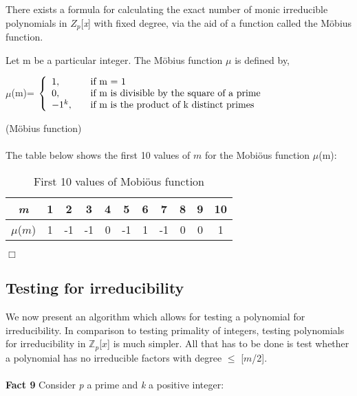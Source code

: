 \documentclass[iwp,first]{luthesis}
\begin{document}
There exists a formula for calculating the exact number of monic irreducible polynomials in $\textit{Z}_p$[\textit{x}] with fixed degree, via the aid of a function called the M\"obius function.

\begin{mydef}
Let m be a particular integer. The M\"obius function $\mu$ is defined by, 

\begin{center}
$\mu$(m)= $\left\{
\begin{array}{l l l}
	1, & \quad \textrm{if m = 1}\\
	0, & \quad \textrm{if m is divisible by the square of a prime}\\
	-1^{k}, & \quad \textrm{if m is the product of k distinct primes}\\
\end{array} \right.$
\end{center}

\end{mydef}

\begin{example} (M\"obius function)
\\
\\
The table below shows the first 10 values of $m$ for the Mobi\"ous function $\mu$(m): 

\begin{table}[ht]
\caption{First 10 values of Mobi\"ous function}
\centering
\begin{tabular}{|c||c|c|c|c|c|c|c|c|c|c|}
\hline
\textit{m} & 1 & 2 & 3 & 4 & 5 & 6 & 7 & 8 & 9 & 10 \\ [0.5ex]
\hline
$\mu$($m$) & 1 & -1 & -1 & 0 & -1 & 1 & -1 & 0 & 0 & 1 \\ [1ex]
\hline
\end{tabular}
\label{table:nonlin}
\end{table} 
\hfill $\Box$

\end{example}

\subsection{Testing for irreducibility}

We now present an algorithm which allows for testing a polynomial for irreducibility. In comparison to testing primality  of integers, testing polynomials for irreducibility in $\mathbb{Z}_p$[$x$] is much simpler. All that has to be done is test whether a polynomial has no irreducible factors with degree $\leq$ [$m$/2].
\\
\\
\textbf{Fact 9} Consider \textit{p} a prime and \textit{k} a positive integer:
\end{document}
